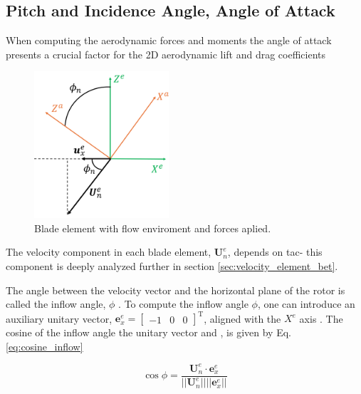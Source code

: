 \subsection{ Pitch and Incidence Angle, Angle of Attack}

When computing the aerodynamic forces and moments the angle of attack presents a crucial factor for the 2D aerodynamic lift and drag coefficients

\begin{figure}[!htb]
    \centering
    \includegraphics[width=5cm]{Figures/background/bet/phi_angle.png}
    \caption{Blade element with flow enviroment and forces aplied.}
    \label{fig:phi_angle}
\end{figure}

The velocity component in each blade element, $\mathbf{U}_n^e$,  depends on   tac{- this component} is deeply analyzed further in section \ref{sec:velocity_element_bet}. 

The angle between the velocity vector and the horizontal plane of the rotor is called the inflow angle, $\phi$ . To compute the inflow angle $\phi$, one can introduce an auxiliary unitary vector, $\mathbf{e}_x^e = \begin{bmatrix} -1 & 0 & 0 \end{bmatrix}^\mathrm{T}$, aligned with the $X^e$ axis . The cosine of the inflow angle  the unitary vector and , is given by Eq. \ref{eq:cosine_inflow}

\begin{equation}
    \cos \phi = \frac{\mathbf{U}_n^e \cdot \mathbf{e}^e_x}{||\mathbf{U}_n^e|| ||\mathbf{e}_x^e||}
    \label{eq:cosine_inflow}
\end{equation}

